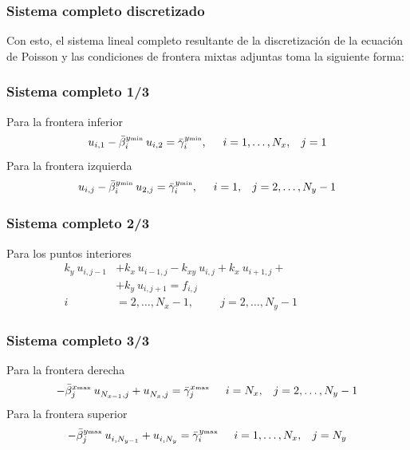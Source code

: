 \documentclass[12pt]{beamer}
\begin{document}
\begin{frame}
\frametitle{Sistema completo discretizado}
Con esto, el sistema lineal completo resultante de la discretización de la ecuación de Poisson y las condiciones de frontera mixtas adjuntas toma la siguiente forma:
\end{frame}
\begin{frame}
\frametitle{Sistema completo 1/3}
Para la frontera inferior
\begin{equation}
u_{i, 1} - \bar{\beta}_{i}^{y {\text{\tiny{min}}}} \: u_{i, 2} = \bar{\gamma}_{i}^{y {\text{\tiny{min}}}}, \hspace{0.5cm} i = 1, \ldots, N_{x}, \hspace{0.3cm} j = 1
\label{eq:ecuacion_13_09}
\end{equation}
\pause
Para la frontera izquierda
\begin{equation}
u_{i, j} - \bar{\beta}_{i}^{y {\text{\tiny{min}}}} \: u_{2, j} = \bar{\gamma}_{i}^{y {\text{\tiny{min}}}}, \hspace{0.5cm} i = 1, \hspace{0.3cm} j = 2, \ldots, N_{y} - 1
\label{eq:ecuacion_13_10}
\end{equation}
\end{frame}
\begin{frame}
\frametitle{Sistema completo 2/3}
Para los puntos interiores
\begin{equation}
\begin{aligned}
k_{y} \: u_{i, j-1} &+ k_{x} \: u_{i-1, j} - k_{xy} \: u_{i, j} + k_{x} \: u_{i+1, j} + \\
&+ k_{y} \: u_{i, j+1} =  f_{i,j} \\
i &= 2, \ldots, N_{x} - 1, \hspace{1cm} j = 2, \ldots, N_{y} - 1 \hspace{2cm}
\end{aligned}
\label{eq:ecuacion_13_11}
\end{equation}
\end{frame}
\begin{frame}
\frametitle{Sistema completo 3/3}
Para la frontera derecha
\begin{equation}
- \bar{\beta}_{j}^{x {\text{\tiny{max}}}} \:  u^{}_{N_{x-1}, j} + u^{}_{N_{x},j}  =  \bar{\gamma}_{j}^{x {\text{\tiny{max}}}} \hspace{0.5cm} i = N_{x}, \hspace{0.3cm} j = 2, \ldots, N_{y} - 1
\label{eq:ecuacion_13_12}
\end{equation}
\pause
Para la frontera superior
\begin{equation}
- \bar{\beta}_{j}^{y {\text{\tiny{max}}}} \:  u^{}_{i, N_{y-1}} + u^{}_{i, N_{y}}  =  \bar{\gamma}_{i}^{y {\text{\tiny{max}}}} \hspace{0.5cm} i = 1, \ldots, N_{x}, \hspace{0.3cm} j = N_{y}
\label{eq:ecuacion_13_13}
\end{equation}
\end{frame}
\end{document}
